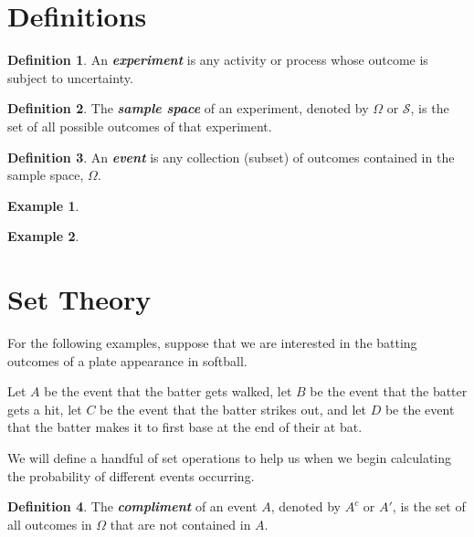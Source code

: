\documentclass[
]{book}
\theoremstyle{definition}
\newtheorem{definition}{Definition}[chapter]
\theoremstyle{definition}
\newtheorem{example}{Example}[chapter]
\theoremstyle{definition}
\theoremstyle{definition}
\theoremstyle{remark}
\begin{document}
\hypertarget{definitions-1}{%
\section{Definitions}\label{definitions-1}}

\begin{definition}
An \textbf{\emph{experiment}} is any activity or process whose outcome is subject to uncertainty.
\end{definition}

\begin{definition}
The \textbf{\emph{sample space}} of an experiment, denoted by \(\Omega\) or \(\mathcal{S}\), is the set of all possible outcomes of that experiment.
\end{definition}

\begin{definition}
An \textbf{\emph{event}} is any collection (subset) of outcomes contained in the sample space, \(\Omega\).
\end{definition}

\begin{example}
\[ \]
\end{example}

\hfill\break
\hfill\break
\hfill\break
\hfill\break
\hfill\break

\begin{example}
\[ \]
\end{example}

\hfill\break
\hfill\break
\hfill\break
\hfill\break
\hfill\break

\hypertarget{set-theory}{%
\section{Set Theory}\label{set-theory}}

For the following examples, suppose that we are interested in the batting outcomes of a plate appearance in softball.

Let \(A\) be the event that the batter gets walked, let \(B\) be the event that the batter gets a hit, let \(C\) be the event that the batter strikes out, and let \(D\) be the event that the batter makes it to first base at the end of their at bat.

We will define a handful of set operations to help us when we begin calculating the probability of different events occurring.

\begin{definition}
The \textbf{\emph{compliment}} of an event \(A\), denoted by \(A^c\) or \(A'\), is the set of all outcomes in \(\Omega\) that are not contained in \(A\).
\end{definition}
\end{document}
